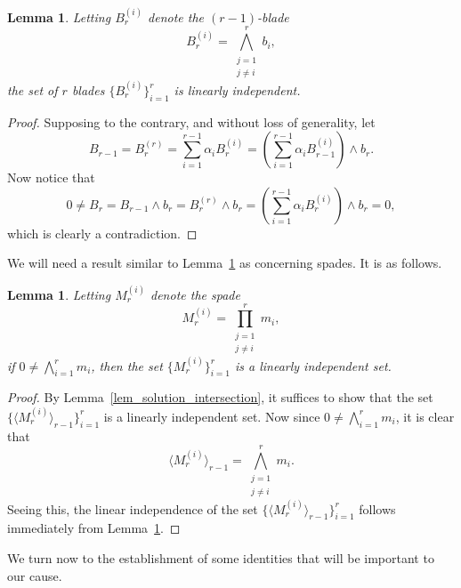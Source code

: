 \documentclass{birkjour}
\newtheorem{lem}[thm]{Lemma}
\theoremstyle{definition}
\theoremstyle{remark}
\numberwithin{equation}{section}
\begin{document}
\begin{lem}\label{lem_lin_indep_subblades}
Letting $B_r^{(i)}$ denote the $(r-1)$-blade
\begin{equation*}
B_r^{(i)} = \bigwedge_{\substack{j=1\\j\neq i}}^r b_i,
\end{equation*}
the set of $r$ blades $\{B_r^{(i)}\}_{i=1}^r$ is linearly independent.
\end{lem}
\begin{proof}
Supposing to the contrary, and without loss of generality, let
\begin{equation*}
B_{r-1} = B_r^{(r)} = \sum_{i=1}^{r-1}\alpha_i B_r^{(i)} = \left(\sum_{i=1}^{r-1}\alpha_i B_{r-1}^{(i)}\right)\wedge b_r.
\end{equation*}
Now notice that
\begin{equation*}
0\neq B_r = B_{r-1}\wedge b_r = B_r^{(r)}\wedge b_r = \left(\sum_{i=1}^{r-1}\alpha_i B_r^{(i)}\right)\wedge b_r = 0,
\end{equation*}
which is clearly a contradiction.
\end{proof}

We will need a result similar to Lemma~\ref{lem_lin_indep_subblades} as concerning spades.  It is as follows.
\begin{lem}\label{lem_lin_indep_subspades}
Letting $M_r^{(i)}$ denote the spade
\begin{equation*}
M_r^{(i)} = \prod_{\substack{j=1\\j\neq i}}^r m_i,
\end{equation*}
if $0\neq\bigwedge_{i=1}^r m_i$, then the set $\{M_r^{(i)}\}_{i=1}^r$ is a linearly independent set.
\end{lem}
\begin{proof}
By Lemma~\ref{lem_solution_intersection}, it suffices to show that the set $\{\langle M_r^{(i)}\rangle_{r-1}\}_{i=1}^r$ is a linearly independent set.
Now since $0\neq\bigwedge_{i=1}^r m_i$, it is clear that
\begin{equation*}
\langle M_r^{(i)}\rangle_{r-1} = \bigwedge_{\substack{j=1\\j\neq i}}^r m_i.
\end{equation*}
Seeing this, the linear independence of the set $\{\langle M_r^{(i)}\rangle_{r-1}\}_{i=1}^r$ follows immediately
from Lemma~\ref{lem_lin_indep_subblades}.
\end{proof}

We turn now to the establishment of some identities that will be important to our cause.
\end{document}
